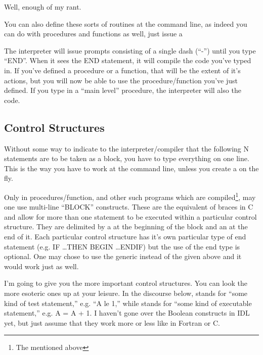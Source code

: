     Well, enough of my rant.

    You can also define these sorts of routines at the command line, as
    indeed you can do with procedures and functions as well, just
    issue a 


    The interpreter will issue prompts consisting of a single dash
    (``-'') until you type ``END''. When it sees the END statement, it
    will compile the code you've typed in. If you've defined a
    procedure or a function, that will be the extent of it's actions,
    but you will now be able to use the procedure/function you've just
    defined. If you type in a ``main level'' procedure, the
    interpreter will also  the code.

    
\ei
  
\subsection{Control
  Structures}\label{sec:qs-Control-Structures}

  Without some way to indicate to the interpreter/compiler that the
  following N statements are to be taken as a block, you
  have to type everything on one line. This is the way you have to
  work at the command line, unless you create a  on the fly. 

  Only in procedures/function, and other such programs which are
  compiled\footnote{The  mentioned above},
  may one use multi-line ``BLOCK'' constructs. These are the
  equivalent of braces in C and allow for more than one statement to
  be executed within a particular control structure. They are
  delimited by a  at the beginning of the block and an
   at the end of it. Each particular control structure has
  it's own particular type of end statement (e.g. IF \ldots THEN BEGIN
  \ldots ENDIF) but the use of the  end type is
  optional. One may chose to use the generic  instead of the
   given above and it would work just as well.

  I'm going to give you the more important control structures. You can
  look the more esoteric ones up at your leisure. In the discourse
  below, \T stands for ``some kind of test statement,'' e.g. ``A
  le 1,'' while \E stands for ``some kind of executable
  statement,'' e.g. A = A + 1.  I haven't gone over the Boolean
  constructs in IDL yet, but just assume that they work more or
  less like in Fortran or C.

